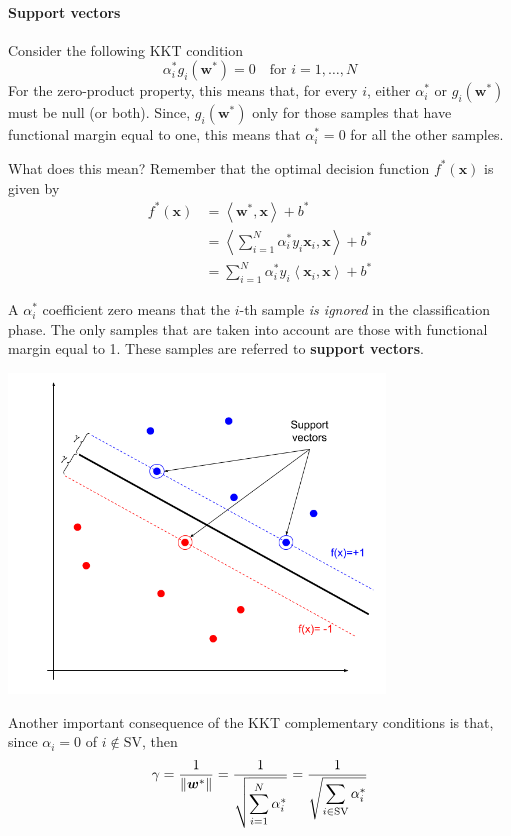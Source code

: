 \documentclass[oneside,onecolumn]{report}
\newcommand{\inp}[2]{\left\langle #1, #2 \right\rangle}
\begin{document}
\paragraph{Support vectors}
Consider the following KKT condition
$$ \alpha_i^* g_i(\bm w^*) = 0 \quad \text{for } i = 1, \dots, N $$
For the zero-product property, this means that, for every $i$, either $\alpha_i^*$ or $g_i(\bm w^*)$ must be null (or both).
Since, $g_i(\bm w^*)$ only for those samples that have functional margin equal to one, this means that $\alpha_i^* = 0$ for all the other samples.

What does this mean?
Remember that the optimal decision function $f^*(\bm x)$ is given by
\begin{align*}
    f^*(\bm x)
    &= \inp{\bm w^*}{\bm x} + b^* \\
    &= \inp{\sum_{i = 1}^N \alpha_i^* y_i \bm x_i}{\bm x} + b^* \\
    &= \sum_{i = 1}^N \alpha_i^* y_i \inp{\bm x_i}{\bm x} + b^*
\end{align*}

A $\alpha_i^*$ coefficient zero means that the $i$-th sample \emph{is ignored} in the classification phase.
The only samples that are taken into account are those with functional margin equal to 1.
These samples are referred to \textbf{support vectors}.

\begin{center}
    \includegraphics[width=10cm]{support_vectors.png}
\end{center}

Another important consequence of the KKT complementary conditions is that, since $\alpha_i = 0$ of $i \not \in \text{SV}$, then
$$ \gamma = \frac{1}{\norm{\bm w^*}} = \frac{1}{\displaystyle \sqrt{\sum_{i = 1}^N \alpha_i^*}} = \frac{1}{\displaystyle \sqrt{\sum_{i \in \text{SV}} \alpha_i^*}} $$
\end{document}
